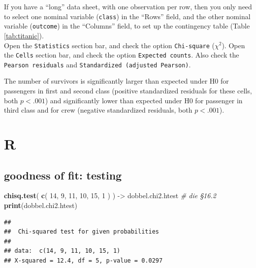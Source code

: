 \documentclass[
]{book}
\newenvironment{Shaded}{\begin{snugshade}}{\end{snugshade}}
\newcommand{\CommentTok}[1]{\textcolor[rgb]{0.56,0.35,0.01}{\textit{#1}}}
\newcommand{\DecValTok}[1]{\textcolor[rgb]{0.00,0.00,0.81}{#1}}
\newcommand{\FunctionTok}[1]{\textcolor[rgb]{0.13,0.29,0.53}{\textbf{#1}}}
\newcommand{\NormalTok}[1]{#1}
\newcommand{\OtherTok}[1]{\textcolor[rgb]{0.56,0.35,0.01}{#1}}
\newcommand{\SpecialCharTok}[1]{\textcolor[rgb]{0.81,0.36,0.00}{\textbf{#1}}}
\begin{document}
If you have a ``long'' data sheet, with one observation per row, then you only need to select one nominal variable (\texttt{class}) in the ``Rows'' field, and the other nominal variable (\texttt{outcome}) in the ``Columns'' field, to set up the contingency table (Table \ref{tab:titanic}).\\
Open the \texttt{Statistics} section bar, and check the option \texttt{Chi-square} (\(\chi^2\)).
Open the \texttt{Cells} section bar, and check the option \texttt{Expected\ counts}. Also check the \texttt{Pearson\ residuals} and \texttt{Standardized\ (adjusted\ Pearson)}.

The number of survivors is significantly larger than expected under H0 for passengers in first and second class (positive standardized residuals for these cells, both \(p<.001\)) and significantly lower than expected under H0 for passenger in third class and for crew (negative standardized residuals, both \(p<.001\)).

\section{R}\label{r-17}

\subsection{goodness of fit: testing}\label{goodness-of-fit-testing-2}

\begin{Shaded}
\begin{Highlighting}[]
\FunctionTok{chisq.test}\NormalTok{( }\FunctionTok{c}\NormalTok{( }\DecValTok{14}\NormalTok{, }\DecValTok{9}\NormalTok{, }\DecValTok{11}\NormalTok{, }\DecValTok{10}\NormalTok{, }\DecValTok{15}\NormalTok{, }\DecValTok{1}\NormalTok{ ) ) }\OtherTok{{-}\textgreater{}}\NormalTok{ dobbel.chi2.htest }\CommentTok{\# die §16.2}
\FunctionTok{print}\NormalTok{(dobbel.chi2.htest)}
\end{Highlighting}
\end{Shaded}

\begin{verbatim}
## 
##  Chi-squared test for given probabilities
## 
## data:  c(14, 9, 11, 10, 15, 1)
## X-squared = 12.4, df = 5, p-value = 0.0297
\end{verbatim}

\begin{Shaded}
\end{Shaded}
\end{document}
